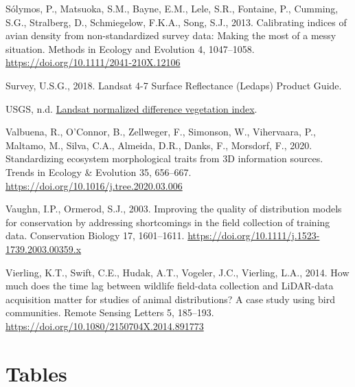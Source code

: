 \documentclass[
]{article}
\newlength{\cslhangindent}
\newlength{\cslentryspacingunit} %
\newenvironment{CSLReferences}[2] %
 {%
  \setlength{\parindent}{0pt}
  \ifodd #1
  \let\oldpar\par
  \def\par{\hangindent=\cslhangindent\oldpar}
  \fi
  \setlength{\parskip}{#2\cslentryspacingunit}
 }%
 {}
\begin{document}
\begin{CSLReferences}{1}{0}
\leavevmode{}%
Sólymos, P., Matsuoka, S.M., Bayne, E.M., Lele, S.R., Fontaine, P., Cumming, S.G., Stralberg, D., Schmiegelow, F.K.A., Song, S.J., 2013. Calibrating indices of avian density from non-standardized survey data: {Making} the most of a messy situation. Methods in Ecology and Evolution 4, 1047--1058. \url{https://doi.org/10.1111/2041-210X.12106}

\leavevmode{}%
Survey, U.S.G., 2018. Landsat 4-7 {Surface} {Reflectance} ({Ledaps}) {Product} {Guide}.

\leavevmode{}%
USGS, n.d. \href{https://www.usgs.gov/land-resources/nli/landsat/landsat-normalized-difference-vegetation-index?qt-science_support_page_related_con=0\#qt-science_support_page_related_con}{Landsat normalized difference vegetation index}.

\leavevmode{}%
Valbuena, R., O'Connor, B., Zellweger, F., Simonson, W., Vihervaara, P., Maltamo, M., Silva, C.A., Almeida, D.R., Danks, F., Morsdorf, F., 2020. Standardizing ecosystem morphological traits from {3D} information sources. Trends in Ecology \& Evolution 35, 656--667. \url{https://doi.org/10.1016/j.tree.2020.03.006}

\leavevmode{}%
Vaughn, I.P., Ormerod, S.J., 2003. Improving the quality of distribution models for conservation by addressing shortcomings in the field collection of training data. Conservation Biology 17, 1601--1611. \url{https://doi.org/10.1111/j.1523-1739.2003.00359.x}

\leavevmode{}%
Vierling, K.T., Swift, C.E., Hudak, A.T., Vogeler, J.C., Vierling, L.A., 2014. How much does the time lag between wildlife field-data collection and {LiDAR}-data acquisition matter for studies of animal distributions? {A} case study using bird communities. Remote Sensing Letters 5, 185--193. \url{https://doi.org/10.1080/2150704X.2014.891773}

\end{CSLReferences}

\pagebreak

\hypertarget{tables}{%
\section*{Tables}\label{tables}}
\end{document}
